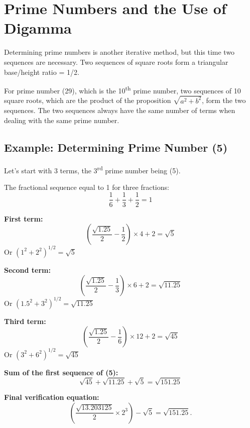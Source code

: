 \documentclass[a4paper,11pt]{article}
\newenvironment{mydef}[1]{%
    \begin{tcolorbox}[colback=blue!5,colframe=holblue,title={\textbf{Definition: #1}}]
}{%
    \end{tcolorbox}
}
\newenvironment{exemple}[1][]{%
    \begin{tcolorbox}[colback=green!5,colframe=holgreen,title={\textbf{Example #1}}]
}{%
    \end{tcolorbox}
}
\begin{document}
\newpage
\section{Prime Numbers and the Use of Digamma}

Determining prime numbers is another iterative method, but this time two sequences are necessary. Two sequences of square roots form a triangular base/height ratio = 1/2.

\begin{mydef}{Sequences for Prime Numbers}
For prime number (29), which is the 10\textsuperscript{th} prime number, two sequences of 10 square roots, which are the product of the proposition $\sqrt{a^2 + b^2}$, form the two sequences. The two sequences always have the same number of terms when dealing with the same prime number.
\end{mydef}

\subsection{Example: Determining Prime Number (5)}

Let's start with 3 terms, the 3\textsuperscript{rd} prime number being (5).

The fractional sequence equal to 1 for three fractions:
\[
\frac{1}{6} + \frac{1}{3} + \frac{1}{2} = 1
\]

\begin{exemple}[: Calculation of the First Sequence for (5)]
\textbf{First term:}
\[
\left(\frac{\sqrt{1.25}}{2} - \frac{1}{2}\right) \times 4 + 2 = \sqrt{5}
\]
Or $(1^2 + 2^2)^{1/2} = \sqrt{5}$

\textbf{Second term:}
\[
\left(\frac{\sqrt{1.25}}{2} - \frac{1}{3}\right) \times 6 + 2 = \sqrt{11.25}
\]
Or $(1.5^2 + 3^2)^{1/2} = \sqrt{11.25}$

\textbf{Third term:}
\[
\left(\frac{\sqrt{1.25}}{2} - \frac{1}{6}\right) \times 12 + 2 = \sqrt{45}
\]
Or $(3^2 + 6^2)^{1/2} = \sqrt{45}$

\textbf{Sum of the first sequence of (5):}
\[
\sqrt{45} + \sqrt{11.25} + \sqrt{5} = \sqrt{151.25}
\]

\textbf{Final verification equation:}
\[
\left( \frac{\sqrt{13.203125}}{2} \times 2^{3} \right) - \sqrt{5}
= \sqrt{151.25}.
\]
\end{exemple}
\end{document}
